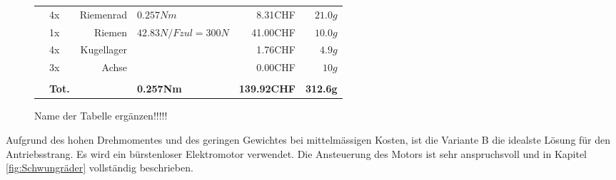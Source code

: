 \begin{figure}[h!]
\begin{tabular}{p{0.5cm}p{0.8cm}rp{3cm}rr}
          & 4x    & Riemenrad       & $0.257 Nm$           & 8.31CHF  & $21.0 g$ \\
          & 1x    & Riemen          & $42.83 N / Fzul=300 N$ & 41.00CHF & $10.0 g$ \\
          & 4x    & Kugellager      &                      & 1.76CHF  & $4.9 g$ \\
          & 3x    & Achse           &                      & 0.00CHF  & $10 g$ \\
          &       &                 &                      &          &  \\
          & \textbf{Tot.} &       & \textbf{0.257Nm} & \textbf{139.92CHF} & \textbf{312.6g} \\
    \end{tabular}%
 	\centering
    \caption{Name der Tabelle ergänzen!!!!!}
    \label{tab:addlabel}%
\end{figure}
Aufgrund des hohen Drehmomentes und des geringen Gewichtes bei mittelmässigen Kosten, ist die Variante B die idealste Lösung für den Antriebsstrang. Es wird ein bürstenloser Elektromotor verwendet. Die Ansteuerung des Motors ist sehr anspruchsvoll und in Kapitel \ref{fig:Schwungräder} vollständig beschrieben.
